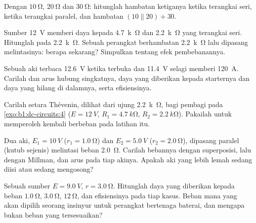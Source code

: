 \begin{exercise}[$\star$]\label{exo:b1:dc-circuits:3}
Dengan $\qty{10}{\ohm}$, $\qty{20}{\ohm}$ dan $\qty{30}{\ohm}$:
hitunglah hambatan ketiganya ketika terangkai seri, ketika terangkai
paralel, dan hambatan $(10 \parallel 20) + 30$.
\end{exercise}

\begin{exercise}[$\star$]\label{exo:b1:dc-circuits:4}
Sumber \qty{12}{V} memberi daya kepada \qty{4.7}{k\ohm} dan
\qty{2.2}{k\ohm} yang terangkai seri. Hitunglah  pada
\qty{2.2}{k\ohm}. Sebuah perangkat berhambatan \qty{2.2}{k\ohm} lalu
dipasang melintasinya: berapa  sekarang? Simpulkan tentang
efek pembebanannya.
\end{exercise}

\begin{exercise}[$\star\star$]\label{exo:b1:dc-circuits:5}
Sebuah aki terbaca \qty{12.6}{V} ketika terbuka dan \qty{11.4}{V}
selagi memberi \qty{120}{A}. Carilah  dan arus hubung
singkatnya, daya yang diberikan kepada starternya dan daya yang hilang
di dalamnya, serta efisiensinya.
\end{exercise}

\begin{exercise}[$\star\star$]\label{exo:b1:dc-circuits:6}
Carilah setara Thévenin, dilihat dari ujung 
\qty{2.2}{k\ohm}, bagi pembagi pada \cref{exo:b1:dc-circuits:4}
($E = \qty{12}{V}$, $R_1 = \qty{4.7}{k\ohm}$, $R_2 = \qty{2.2}{k\ohm}$).
Pakailah untuk memperoleh kembali  berbeban pada latihan itu.
\end{exercise}

\begin{exercise}[$\star\star$]\label{exo:b1:dc-circuits:7}
Dua aki, $E_1 = \qty{10}{V}$ ($r_1 = \qty{1.0}{\ohm}$) dan
$E_2 = \qty{5.0}{V}$ ($r_2 = \qty{2.0}{\ohm}$), dipasang paralel
(kutub sejenis) melintasi beban \qty{2.0}{\ohm}. Carilah 
bebannya dengan superposisi, lalu dengan Millman, dan arus pada tiap
akinya. Apakah aki yang lebih lemah sedang diisi atau sedang mengosong?
\end{exercise}

\begin{exercise}[$\star\star$]\label{exo:b1:dc-circuits:8}
Sebuah sumber $E = \qty{9.0}{V}$, $r = \qty{3.0}{\ohm}$. Hitunglah daya
yang diberikan kepada beban $\qty{1.0}{\ohm}$, $\qty{3.0}{\ohm}$,
$\qty{12}{\ohm}$, dan efisiensinya pada tiap kasus. Beban mana yang akan
dipilih seorang insinyur untuk perangkat bertenaga baterai, dan mengapa
bukan beban yang tersesuaikan?
\end{exercise}

